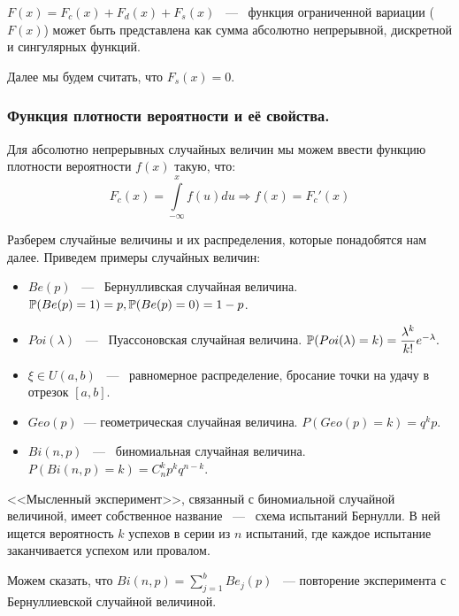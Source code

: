 \begin{theorem}
    $F(x) = F_c(x) + F_d(x) + F_s(x)$ ~---~ функция ограниченной вариации ($F(x)$) может быть представлена как сумма абсолютно непрерывной, дискретной и сингулярных функций. 

    \noindent Далее мы будем считать, что $F_s(x) = 0$. 
\end{theorem}
\subsubsection{Функция плотности вероятности и её свойства.}
\begin{definition}
    Для абсолютно непрерывных случайных величин мы можем ввести функцию плотности вероятности $f(x)$ такую, что:
    \begin{equation*}
        F_c(x) = \int\limits_{-\infty}^{x} f(u) du \Rightarrow f(x) = F_c'(x)
    \end{equation*}
\end{definition}
Разберем случайные величины и их распределения, которые понадобятся нам далее. 
Приведем примеры случайных величин: 
\begin{itemize}
    \item $Be(p)$ ~---~ Бернулливская случайная величина. $\P(Be(p) = 1) = p, \P(Be(p) = 0) = 1 - p$.
    \item $Poi(\lambda)$ ~---~ Пуассоновская случайная величина. $\P(Poi(\lambda) = k) = \dfrac{\lambda^k}{k!}e^{-\lambda}.$
    \item $\xi \in U(a, b)$ ~---~ равномерное распределение, бросание точки на удачу в отрезок $[a, b]$.
    \item $Geo(p)$~--- геометрическая случайная величина. $P(Geo(p) = k) = q^kp.$
    \item $Bi(n, p)$ ~---~ биномиальная случайная величина. $P(Bi(n, p) = k) = C_n^kp^kq^{n - k}$.
\end{itemize}

\noindent <<Мысленный эксперимент>>, связанный с биномиальной случайной величиной, имеет собственное название ~---~ схема испытаний Бернулли. В ней ищется вероятность $k$ успехов в серии из $n$ испытаний, где каждое испытание заканчивается успехом или провалом. 

\noindent Можем сказать, что $Bi(n, p) = \sum\limits_{j = 1}^{b} Be_j(p)$ ~--- повторение эксперимента с Бернуллиевской случайной величиной. 

